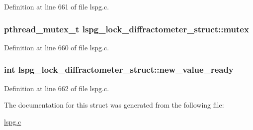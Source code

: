 Definition at line 661 of file lspg.c.\hypertarget{structlspg__lock__diffractometer__struct_a362e848dfd1551428b8d12d8776fd2ed}{
\subsubsection[{mutex}]{\setlength{\rightskip}{0pt plus 5cm}pthread\_\-mutex\_\-t {\bf lspg\_\-lock\_\-diffractometer\_\-struct::mutex}}}
\label{structlspg__lock__diffractometer__struct_a362e848dfd1551428b8d12d8776fd2ed}


Definition at line 660 of file lspg.c.\hypertarget{structlspg__lock__diffractometer__struct_ae94acdf44008ce48930e3083f08f5b6c}{
\subsubsection[{new\_\-value\_\-ready}]{\setlength{\rightskip}{0pt plus 5cm}int {\bf lspg\_\-lock\_\-diffractometer\_\-struct::new\_\-value\_\-ready}}}
\label{structlspg__lock__diffractometer__struct_ae94acdf44008ce48930e3083f08f5b6c}


Definition at line 662 of file lspg.c.

The documentation for this struct was generated from the following file:\begin{DoxyCompactItemize}
\item 
\hyperlink{lspg_8c}{lspg.c}\end{DoxyCompactItemize}
